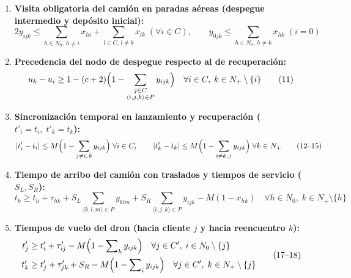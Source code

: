 \begin{enumerate}[label=\textbf{\arabic*.}, leftmargin=*, itemsep=1.0pt, topsep=1.5pt, parsep=0pt]
\item \textbf{Visita obligatoria del camión en paradas aéreas (despegue intermedio y depósito inicial):}
\begin{equation}
2 y_{ijk} \le \sum_{h \in N_0,\, h \neq i} x_{hi} + \sum_{l \in C,\, l \neq k} x_{lk} \; (\forall i \in C), \qquad y_{0jk} \le \sum_{h \in N_0,\, h \neq k} x_{hk} \; (i=0) 
\tag{9--10}
\end{equation}

\item \textbf{Precedencia del nodo de despegue respecto al de recuperación:}
\begin{equation}
u_k - u_i \ge 1 - (c+2)\Bigl(1 - \sum_{\substack{j \in C \\ \langle i,j,k \rangle \in P}} y_{ijk}\Bigr) \quad \forall i \in C, \; k \in N_+ \setminus \{i\} 
\tag{11}
\end{equation}

\item \textbf{Sincronización temporal en lanzamiento y recuperación ($t'_i = t_i, \; t'_k = t_k$):}
\begin{equation}
|t'_i - t_i| \le M\Bigl(1 - \sum_{j \neq i,\, k} y_{ijk}\Bigr) \; \forall i \in C, \qquad |t'_k - t_k| \le M\Bigl(1 - \sum_{i \neq k,\, j} y_{ijk}\Bigr) \; \forall k \in N_+ 
\tag{12--15}
\end{equation}

\item \textbf{Tiempo de arribo del camión con traslados y tiempos de servicio ($S_L, S_R$):}
\begin{equation}
t_k \ge t_h + \tau_{hk} + S_L \sum_{\langle k,l,m \rangle \in P} y_{klm} + S_R \sum_{\langle i,j,k \rangle \in P} y_{ijk} - M(1 - x_{hk}) \quad \forall h \in N_0, \; k \in N_+ \setminus \{h\} 
\tag{16}
\end{equation}

\item \textbf{Tiempos de vuelo del dron (hacia cliente $j$ y hacia reencuentro $k$):}
\begin{equation}
\begin{aligned}
t'_j &\ge t'_i + \tau'_{ij} - M\Bigl(1 - \sum\nolimits_{k} y_{ijk}\Bigr) \quad \forall j \in C', \; i \in N_0 \setminus \{j\} \\
t'_k &\ge t'_j + \tau'_{jk} + S_R - M\Bigl(1 - \sum\nolimits_{i} y_{ijk}\Bigr) \quad \forall j \in C', \; k \in N_+ \setminus \{j\}
\end{aligned}
\tag{17--18}
\end{equation}


\end{enumerate}
